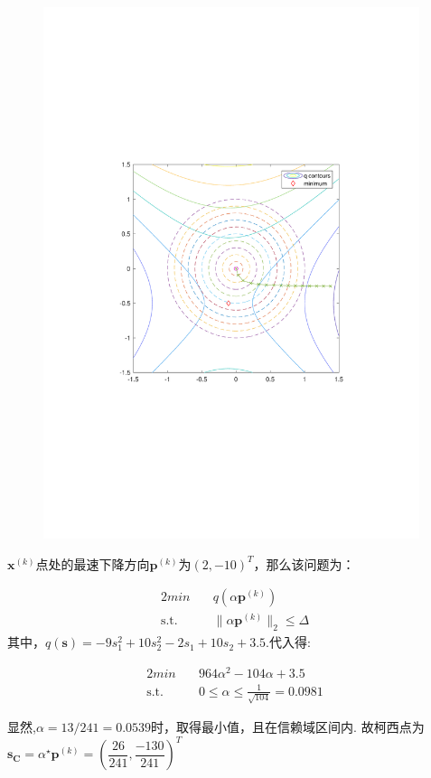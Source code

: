 \documentclass[UTF8]{ctexart}
\begin{document}
\begin{enumerate}
\begin{enumerate}
\begin{figure}[H]
\centering
\includegraphics[width=11cm]{4.pdf}
\end{figure}

$\bm{x}^{(k)}$点处的最速下降方向$\bm{p}^{(k)}$为$(2,-10)^T$，那么该问题为：

\begin{alignat}{2}
min \quad & q(\alpha \bm{p}^{(k)}) \nonumber\\
\mbox{s.t.}\quad
&\|\alpha \bm{p}^{(k)}\|_2\leq\Delta \nonumber
\end{alignat}
其中，$q(\bm{s})=-9s_1^2+10s_2^2-2s_1+10s_2+3.5$.代入得:

\begin{alignat}{2}
min \quad & 964\alpha^2-104\alpha+3.5 \nonumber\\
\mbox{s.t.}\quad
&0\leq \alpha\leq \frac{1}{\sqrt{104}}=0.0981 \nonumber
\end{alignat}

显然,$\alpha=13/241=0.0539$时，取得最小值，且在信赖域区间内.
故柯西点为$\bm{s_C}=\alpha^{\star} \bm{p}^{(k)}=(\dfrac{26}{241},\dfrac{-130}{241})^T$
\end{enumerate}


\end{enumerate}
\end{document}
